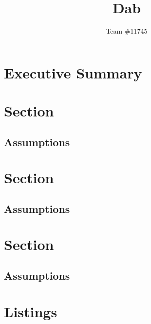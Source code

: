 \documentclass[12pt,letterpaper]{article}
\title{Dab}
\author{Team \#11745}
\begin{document}
\maketitle
\newpage

\section*{Executive Summary}

\newpage
\tableofcontents

\newpage
\section{Section}

\subsection{Assumptions}

\section{Section}

\subsection{Assumptions}

\section{Section}

\subsection{Assumptions}


\newpage


\newpage

\appendix
\listoffigures
\listoftables

\section{Listings}
\end{document}
